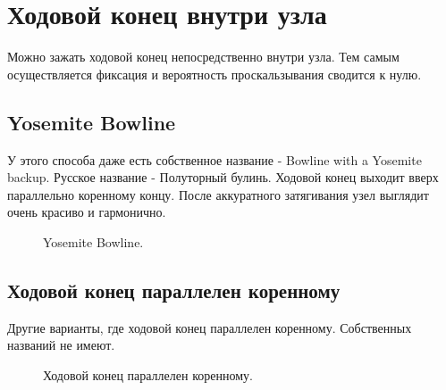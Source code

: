 \documentclass{artikel1}
\begin{document}
\section{Ходовой конец внутри узла}

Можно зажать ходовой конец непосредственно внутри узла. Тем самым осуществляется фиксация и вероятность проскальзывания сводится к нулю.

\subsection{Yosemite Bowline}

У этого способа даже есть собственное название - Bowline with a Yosemite backup. Русское название - Полуторный булинь. Ходовой конец выходит вверх параллельно коренному концу. После аккуратного затягивания узел выглядит очень красиво и гармонично.

\begin{figure}[H]\centering
\hfill
	\caption{Yosemite Bowline.}\label{ris:Besedochny-Yosemite}
\end{figure}

\subsection{Ходовой конец параллелен коренному}

Другие варианты, где ходовой конец параллелен коренному. Собственных названий не имеют.

\begin{figure}[H]\centering
\hfill
\hfill
	\caption{Ходовой конец параллелен коренному.}\label{ris:Besedochny_hodovoy_inside_paral}
\end{figure}
\end{document}

